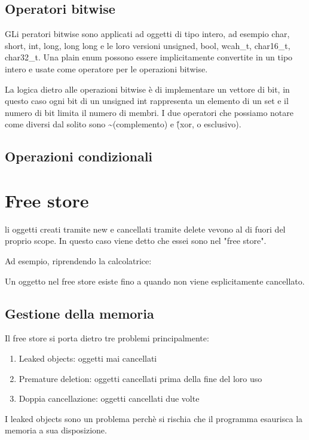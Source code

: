 \documentclass[11pt,a4paper]{book}
\begin{document}
\subsection{Operatori bitwise}
GLi peratori bitwise sono applicati ad oggetti di tipo intero, ad esempio char, short, int, long, long long e le loro versioni unsigned, bool, wcah\_t, char16\_t, char32\_t. Una plain enum possono essere implicitamente convertite in un tipo intero e usate come operatore per le operazioni bitwise.

La logica dietro alle operazioni bitwise è di implementare un vettore di bit, in questo caso ogni bit di un unsigned int rappresenta un elemento di un set e il numero di bit limita il numero di membri. I due operatori che possiamo notare come diversi dal solito sono \sim (complemento) e \^ (xor, o esclusivo).

\subsection{Operazioni condizionali}
\label{code: 154}

\section{Free store}
li oggetti creati tramite new e cancellati tramite delete vevono al di fuori del proprio scope. In questo caso viene detto che essei sono nel "free store".

Ad esempio, riprendendo la calcolatrice:
\label{code: 155}


Un oggetto nel free store esiste fino a quando non viene esplicitamente cancellato.

\subsection{Gestione della memoria}
Il free store si porta dietro tre problemi principalmente:
\begin{enumerate}
	\item Leaked objects: oggetti mai cancellati
	\item Premature deletion: oggetti cancellati prima della fine del loro uso
	\item Doppia cancellazione: oggetti cancellati due volte
\end{enumerate}

I leaked objects sono un problema perchè si rischia che il programma esaurisca la memoria a sua disposizione.
\end{document}
